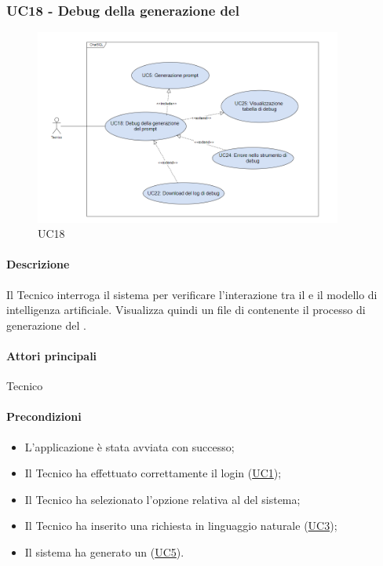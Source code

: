 \subsubsection{UC18 - Debug della generazione del }\label{UC18}

\begin{figure}[H]
  \centering
  \includegraphics[width=0.90\textwidth]{assets/uc18.png}
  \caption{UC18}
\end{figure}

\paragraph*{Descrizione}
Il Tecnico interroga il sistema per verificare l'interazione tra il  e il modello di intelligenza artificiale. Visualizza quindi un file di  contenente il processo di generazione del .

\paragraph*{Attori principali}
Tecnico

\paragraph*{Precondizioni}
\begin{itemize}
  \item L'applicazione è stata avviata con successo;
  \item Il Tecnico ha effettuato correttamente il login (\hyperref[UC1]{UC1});
  \item Il Tecnico ha selezionato l'opzione relativa al  del sistema;
  \item Il Tecnico ha inserito una richiesta in linguaggio naturale (\hyperref[UC3]{UC3});
  \item Il sistema ha generato un  (\hyperref[UC5]{UC5}).
\end{itemize}

